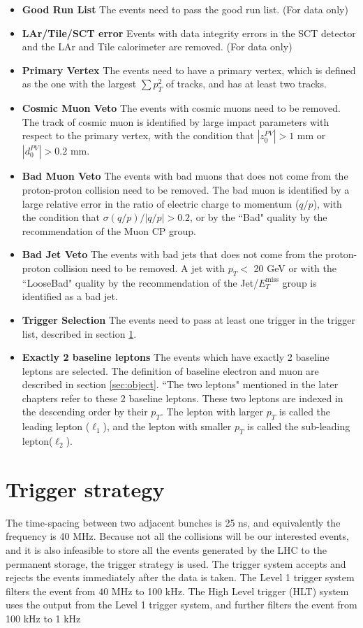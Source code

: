 \begin{itemize}
\item \textbf{Good Run List} The events need to pass the good run list. (For data only)
\item \textbf{LAr/Tile/SCT error} Events with data integrity errors in the SCT detector and the LAr and Tile calorimeter are removed. (For data only)
\item \textbf{Primary Vertex} The events need to have a primary vertex, which is defined as the one with the largest $\sum p_{T}^{2}$ of tracks, and has at least two tracks.
\item \textbf{Cosmic Muon Veto} The events with cosmic muons need to be removed. The track of cosmic muon is identified by large impact parameters with respect to the primary vertex, with the condition that $|z_{0}^{PV}|>1$ mm or $|d_{0}^{PV}|>0.2$ mm.
\item \textbf{Bad Muon Veto} The events with bad muons that does not come from the proton-proton collision need to be removed. The bad muon is identified by a large relative error in the ratio of electric charge to momentum ($q/p$), with the condition that $\sigma(q/p) / |q/p| > 0.2$, or by the ``Bad" quality by the recommendation of the Muon CP group.
\item \textbf{Bad Jet Veto} The events with bad jets that does not come from the proton-proton collision need to be removed. A jet with $p_{T}<$ 20 GeV or with the ``LooseBad" quality by the recommendation of the Jet/$E_T^{\text{miss}}$ group is identified as a bad jet.
\item \textbf{Trigger Selection} The events need to pass at least one trigger in the trigger list, described in section \ref{sec:trigger}.
\item \textbf{Exactly 2 baseline leptons} The events which have exactly 2 baseline leptons are selected. The definition of baseline electron and muon are described in section \ref{sec:object}. ``The two leptons" mentioned in the later chapters refer to these 2 baseline leptons. These two leptons are indexed in the descending order by their $p_T$. The lepton with larger $p_T$ is called the leading lepton ($\ell_1$), and the lepton with smaller $p_T$ is called the sub-leading lepton($\ell_2$).
\end{itemize}

\section{Trigger strategy}
\label{sec:trigger}
The time-spacing between two adjacent bunches is 25 ns, and equivalently the frequency is 40 MHz.
Because not all the collisions will be our interested events, and it is also infeasible to store all the events generated by the LHC to the permanent storage, the trigger strategy is used.
The trigger system accepts and rejects the events immediately after the data is taken.
The Level 1 trigger system filters the event from 40 MHz to 100 kHz.
The High Level trigger (HLT) system uses the output from the Level 1 trigger system, and further filters the event from 100 kHz to 1 kHz

